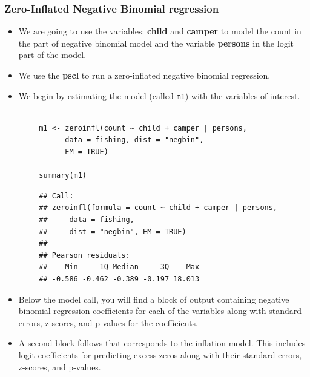 \documentclass[MASTER.tex]{subfiles}
\begin{document}
	
	\begin{frame}
	\Large
		\frametitle{Zero-Inflated Negative Binomial regression}
\begin{itemize}
\item  We are going to use the variables: \textbf{child} and \textbf{camper} to model the count in the part of negative binomial model and the variable \textbf{persons} in the logit part of the model. 
\item We use the \textbf{pscl} to run a zero-inflated negative binomial regression. 
\item We begin by estimating the model (called \texttt{m1}) with the variables of interest.
\end{itemize}	
		

\end{frame}
\begin{frame}[fragile]
	\large
\begin{verbatim}
		
		m1 <- zeroinfl(count ~ child + camper | persons,
			  data = fishing, dist = "negbin", 
			  EM = TRUE)
		
		summary(m1)
\end{verbatim}
\end{frame}
\begin{frame}[fragile]
	\begin{verbatim}
		## Call:
		## zeroinfl(formula = count ~ child + camper | persons, 
		##     data = fishing, 
		##     dist = "negbin", EM = TRUE)
		## 
		## Pearson residuals:
		##    Min     1Q Median     3Q    Max 
		## -0.586 -0.462 -0.389 -0.197 18.013 
\end{verbatim}
\end{frame}
\begin{frame}[fragile]
	
	\begin{itemize}	
		\item Below the model call, you will find a block of output containing negative binomial regression coefficients for each of the variables along with standard errors, z-scores, and p-values for the coefficients. 
		\item A second block follows that corresponds to the inflation model. This includes logit coefficients for predicting excess zeros along with their standard errors, z-scores, and p-values.
	\end{itemize}
\end{frame}
\end{document}
